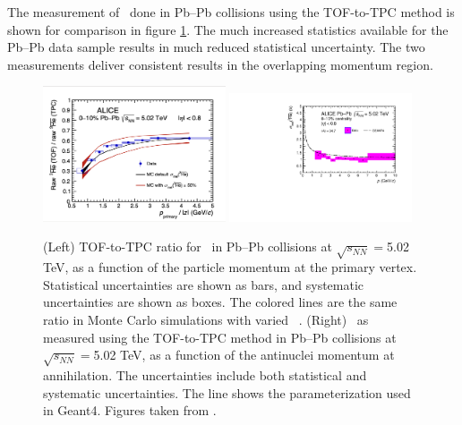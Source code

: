 The measurement of \sigmainel\ done in Pb--Pb collisions using the TOF-to-TPC method is shown for comparison in figure \ref{fig:Ahe_sigma_inel_PbPb}. The much increased statistics available for the Pb--Pb data sample results in much reduced statistical uncertainty. The two measurements deliver consistent results in the overlapping momentum region.

\begin{figure}
    \centering
    \includegraphics[width=0.48\textwidth]{figures/he3bar_TOF-to-TPC-ratio.png}
    \includegraphics[width=0.48\textwidth]{figures/Antihelium_inelastic_cross_section_PbPb.pdf}
    \caption{(Left) TOF-to-TPC ratio for \ahe\ in Pb--Pb collisions at $\sqrt{s_{NN}}=$5.02 TeV, as a function of the particle momentum at the primary vertex. Statistical uncertainties are shown as bars, and systematic uncertainties are shown as boxes. The colored lines are the same ratio in Monte Carlo simulations with varied \sigmainel\ . (Right) \sigmainel\ as measured using the TOF-to-TPC method in Pb--Pb collisions at $\sqrt{s_{NN}}=$5.02 TeV, as a function of the antinuclei momentum at annihilation. The uncertainties include both statistical and systematic uncertainties. The line shows the parameterization used in Geant4. Figures taken from \cite{antiHe3XS}.}
    \label{fig:Ahe_sigma_inel_PbPb}
\end{figure}

